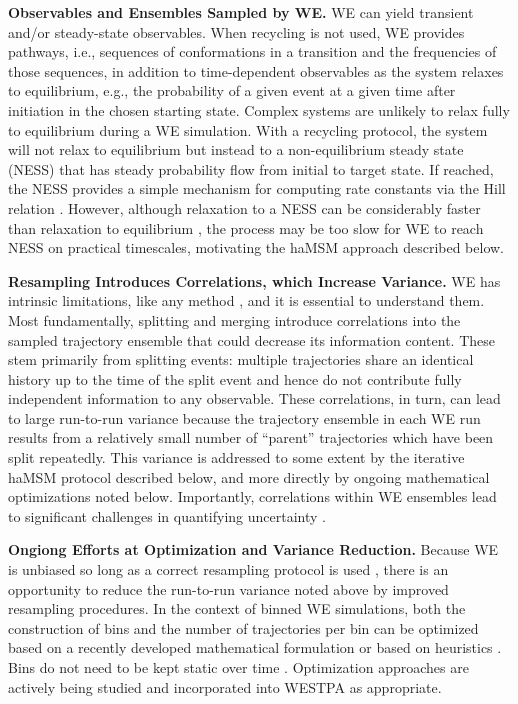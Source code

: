 \textbf{Observables and Ensembles Sampled by WE.} WE can yield transient and/or steady-state observables. 
When recycling is not used, WE provides pathways, i.e., sequences of conformations in a transition and the frequencies of those sequences, in addition to time-dependent observables as the system relaxes to equilibrium, e.g., the probability of a given event at a given time after initiation in the chosen starting state.
Complex systems are unlikely to relax fully to equilibrium during a WE simulation. 
With a recycling protocol, the system will not relax to equilibrium but instead to a non-equilibrium steady state (NESS) that has steady probability flow from initial to target state. 
If reached, the NESS provides a simple mechanism for computing rate constants via the Hill relation \citep{bhatt_steady-state_2010}. 
However, although relaxation to a NESS can be considerably faster than relaxation to equilibrium \citep{copperman_transient_2019,zuckerman_discrete-state_nodate}, the process may be too slow for WE to reach NESS on practical timescales, motivating the haMSM approach \citep{adhikari_computational_2019,copperman_accelerated_2020} described below.

\textbf{Resampling Introduces Correlations, which Increase Variance.} WE has intrinsic limitations, like any method \citep{chong_path-sampling_2017}, and it is essential to understand them. 
Most fundamentally, splitting and merging introduce correlations into the sampled trajectory ensemble that could decrease its information content. 
These stem primarily from splitting events: multiple trajectories share an identical history up to the time of the split event and hence do not contribute fully independent information to any observable.
These correlations, in turn, can lead to large run-to-run variance \citep{adhikari_computational_2019} because the trajectory ensemble in each WE run results from a relatively small number of “parent” trajectories which have been split repeatedly.
This variance is addressed to some extent by the iterative haMSM protocol described below, and more directly by ongoing mathematical optimizations noted below.  
Importantly, correlations within WE ensembles lead to significant challenges in quantifying uncertainty \citep{zuckerman_weighted_2017,mostofian_statistical_2019}.

\textbf{Ongiong Efforts at Optimization and Variance Reduction.} Because WE is unbiased so long as a correct resampling protocol is used \citep{zhang_exact_2010}, there is an opportunity to reduce the run-to-run variance noted above by improved resampling procedures. 
In the context of binned WE simulations, both the construction of bins and the number of trajectories per bin can be optimized based on a recently developed mathematical formulation \citep{aristoff_analysis_2018, aristoff_optimizing_2020} or based on heuristics \citep{torrillo_minimal_2021}. 
Bins do not need to be kept static over time \citep{zhang_exact_2010,torrillo_minimal_2021}. 
Optimization approaches are actively being studied and incorporated into WESTPA as appropriate.

